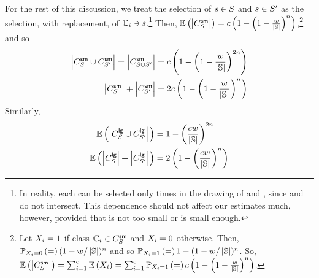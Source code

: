 For the rest of this discussion, we treat the selection of
$s\in S_{}$ and $s \in S_{}'$ as
the selection, with replacement, of $\mathbb{C}_{i} \ni
s$.\footnote{In reality, each \class{\classIdx} can be
  selected only \classesSize times in the drawing of \secretsSet{} and
  \secretsSetAlt{}, since \secretsSet{} and \secretsSetAlt{} do not
  intersect.  This dependence should not affect our estimates much,
  however, provided that \classesSize is not too small or
  \secretsSetSize is small enough.}  Then,
$\mathbb{E}\left({\left|{C_{S_{}}^{\textsf{sm}}}\right|}\right) = c
\left(1-\left(1-\frac{w}{\left|{\mathbb{S}}\right|}\right)^{n}\right)$,\footnote{Let
  $X_{i} = 1$ if class $\mathbb{C}_{i} \in
  C_{S_{}}^{\textsf{sm}}$ and $X_{i} = 0$
  otherwise.  Then, $\mathbb{P}_{X_{i} = 0}\left({=}\right)
  (1-w/\left|{\mathbb{S}}\right|)^{n}$ and so
  $\mathbb{P}_{X_{i} = 1}\left({=}\right) 1 -
  (1-w/\left|{\mathbb{S}}\right|)^{n}$.  So,
  $\mathbb{E}\left({\left|{C_{S_{}}^{\textsf{sm}}}\right|}\right) = \sum_{i
    = 1}^{c} \mathbb{E}\left({X_{i}}\right) =
  \sum_{i = 1}^{c} \mathbb{P}_{X_{i} =
    1}\left({=}\right) c
  \left(1-\left(1-\frac{w}{\left|{\mathbb{S}}\right|}\right)^{n}\right)$.}
and so
  \begin{align*}
    {\ensuremath{\left|{C_{S_{}}^{\textsf{sm}} \cup C_{S_{}'}^{\textsf{sm}}}\right|}}
    ={\left|{C_{S_{}\cup S_{}'}^{\textsf{sm}}}\right|} 
    & = c \left(1-\left(1-\frac{w}{\left|{\mathbb{S}}\right|}\right)^{2n}\right) \\
    {\left|{C_{S_{}}^{\textsf{sm}}}\right|+\left|{C_{S_{}'}^{\textsf{sm}}}\right|}
    & = 2c \left(1-\left(1-\frac{w}{\left|{\mathbb{S}}\right|}\right)^{n}\right)
  \end{align*}
Similarly,
\begin{align}
\mathbb{E}\left({\left|{C_{S_{}}^{\textsf{lg}}\cup C_{S_{}'}^{\textsf{lg}}}\right|}\right) &=
1-\left(\frac{cw}{\left|{\mathbb{S}}\right|}\right)^{2n}\nonumber\\
\mathbb{E}\left({\left|{C_{S_{}}^{\textsf{lg}}}\right|+\left|{C_{S_{}'}^{\textsf{lg}}}\right|}\right)&=
2\left(1-\left(\frac{cw}{\left|{\mathbb{S}}\right|}\right)^{n}\right)\nonumber
\end{align}
